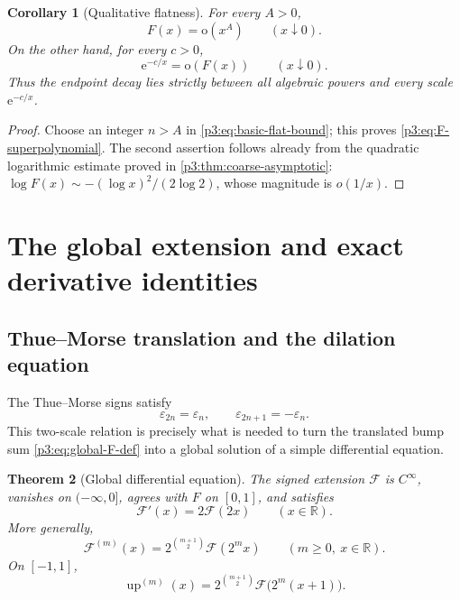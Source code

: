\documentclass[11pt]{article}
\numberwithin{equation}{section}
\newtheorem{theorem}{Theorem}[section]
\newtheorem{corollary}[theorem]{Corollary}
\theoremstyle{definition}
\theoremstyle{remark}
\newcommand{\R}{\mathbb R}
\newcommand{\GF}{\mathcal F}
\newcommand{\upf}{\operatorname{up}}
\newcommand{\eps}{\varepsilon}
\newcommand{\e}{\mathrm e}
\newcommand{\littleoh}{\mathrm o}
\begin{document}
\begin{corollary}[Qualitative flatness]\label{p3:cor:superpolynomial}
For every $A>0$,
\begin{equation}\label{p3:eq:F-superpolynomial}
 F(x)=\littleoh(x^A)\qquad(x\downarrow0).
\end{equation}
On the other hand, for every $c>0$,
\begin{equation}\label{p3:eq:F-slower-exp}
 \e^{-c/x}=\littleoh(F(x))\qquad(x\downarrow0).
\end{equation}
Thus the endpoint decay lies strictly between all algebraic powers and every scale $\e^{-c/x}$.
\end{corollary}

\begin{proof}
Choose an integer $n>A$ in \eqref{p3:eq:basic-flat-bound}; this proves \eqref{p3:eq:F-superpolynomial}.  The second assertion follows already from the quadratic logarithmic estimate proved in \cref{p3:thm:coarse-asymptotic}:
$\log F(x)\sim-(\log x)^2/(2\log2)$, whose magnitude is $o(1/x)$.
\end{proof}

\section{The global extension and exact derivative identities}\label{p3:sec:global}

\subsection{Thue--Morse translation and the dilation equation}

The Thue--Morse signs satisfy
\begin{equation}\label{p3:eq:TM-recursion}
 \eps_{2n}=\eps_n,\qquad \eps_{2n+1}=-\eps_n.
\end{equation}
This two-scale relation is precisely what is needed to turn the translated bump sum \eqref{p3:eq:global-F-def} into a global solution of a simple differential equation.

\begin{theorem}[Global differential equation]\label{p3:thm:global-differential}
The signed extension $\GF$ is $C^\infty$, vanishes on $(-\infty,0]$, agrees with $F$ on $[0,1]$, and satisfies
\begin{equation}\label{p3:eq:global-diff}
 \GF'(x)=2\GF(2x)\qquad(x\in\R).
\end{equation}
More generally,
\begin{equation}\label{p3:eq:global-higher-derivatives}
 \GF^{(m)}(x)=2^{\binom{m+1}{2}}\GF(2^m x)
 \qquad(m\ge0,\ x\in\R).
\end{equation}
On $[-1,1]$,
\begin{equation}\label{p3:eq:up-higher-derivatives}
 \upf^{(m)}(x)=2^{\binom{m+1}{2}}\GF\bigl(2^m(x+1)\bigr).
\end{equation}
\end{theorem}
\end{document}

